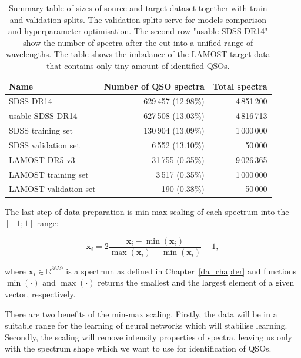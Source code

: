 \begin{table}
\begin{center}
\begin{tabular}{|l|r|r|}
	\hline
	Name & Number of QSO spectra & Total spectra \\ \hline \hline
	SDSS DR14 & 629\,457 (12.98\%) & 4\,851\,200 \\ \hline
	usable SDSS DR14 & 627\,508 (13.03\%) & 4\,816\,713 \\ \hline
	SDSS training set & 130\,904 (13.09\%) & 1\,000\,000 \\ \hline
	SDSS validation set & 6\,552 (13.10\%) & 50\,000 \\ \hline
	LAMOST DR5 v3 & 31\,755 (0.35\%) & 9\,026\,365 \\ \hline
	LAMOST training set & 3\,517 (0.35\%) & 1\,000\,000 \\ \hline
	LAMOST validation set & 190 (0.38\%) & 50\,000 \\ \hline
\end{tabular}
\end{center}
\caption[Sizes of source and target datasets]{
	Summary table of sizes of source and target dataset
	together with train and validation splits.
	The validation splits serve for models comparison
	and hyperparameter optimisation.
	The second row "usable SDSS DR14" show the number of spectra
	after the cut into a unified range of wavelengths.
	The table shows the imbalance of the LAMOST target data
	that contains only tiny amount of identified QSOs.
	}
\label{datasets_sizes}
\end{table}

The last step of data preparation is min-max scaling of each spectrum into the \([-1; 1]\) range:

\begin{equation}
	\mathbf{x}_i = 2 \frac{\mathbf{x}_i - \min(\mathbf{x}_i)}{
		\max(\mathbf{x}_i) - \min(\mathbf{x}_i)} - 1,
\end{equation}

where \(\mathbf{x}_i \in \mathbb{R}^{3659}\) is a spectrum as defined in Chapter~\ref{da_chapter}
and functions \(\min(\cdot)\) and \(\max(\cdot)\) returns the smallest and the largest element of a given vector, respectively.

There are two benefits of the min-max scaling.
Firstly, the data will be in a suitable range for the learning of neural networks
which will stabilise learning.
Secondly, the scaling will remove intensity properties of spectra,
leaving us only with the spectrum shape
which we want to use for identification of QSOs.

